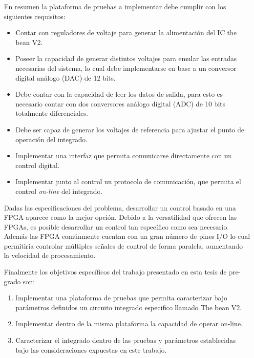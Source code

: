 En resumen la plataforma de pruebas a implementar debe cumplir con los siguientes requisitos:
\begin{itemize}
\item Contar con reguladores de voltaje para generar la alimentación del IC the bean V2.
\item Poseer la capacidad de generar distintos voltajes para emular las entradas necesarias del sistema, lo cual debe implementarse en base a un conversor digital análogo (DAC) de 12 bits.
\item Debe contar con la capacidad de leer los datos de salida, para esto es necesario contar con dos conversores análogo digital (ADC) de 10 bits totalmente diferenciales.
\item Debe ser capaz de generar los voltajes de referencia para ajustar el punto de operación del integrado.
\item Implementar una interfaz que permita comunicarse directamente con un control digital.
\item Implementar junto al control un protocolo de comunicación, que permita el control \textit{on-line} del integrado.
\end{itemize}

 Dadas las especificaciones del problema, desarrollar un control basado en una FPGA aparece como la mejor opción. Debido a la versatilidad que ofrecen las FPGAs, es posible desarrollar un control tan específico como sea necesario. Además las FPGA comúnmente cuentan con un gran número de pines I/O lo cual permitiría controlar múltiples señales de control de forma paralela, aumentando la velocidad de procesamiento.	
 
 
Finalmente los objetivos específicos del trabajo presentado en esta tesis de pre-grado son:


\begin{enumerate}
\item Implementar una plataforma de pruebas que permita caracterizar bajo parámetros definidos un circuito integrado especifico llamado The bean V2.
\item Implementar dentro de la misma plataforma la capacidad de operar on-line.
\item Caracterizar el integrado dentro de las pruebas y parámetros establecidas bajo las consideraciones expuestas en este trabajo.
\end{enumerate}